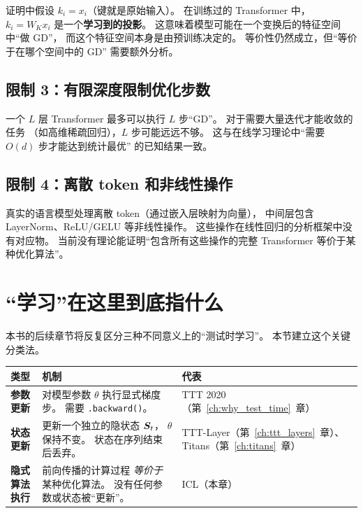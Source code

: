 证明中假设 $k_i = x_i$（键就是原始输入）。
在训练过的 Transformer 中，
$k_i = W_K x_i$ 是一个\textbf{学习到的投影}。
这意味着模型可能在一个变换后的特征空间中``做 GD''，
而这个特征空间本身是由预训练决定的。
等价性仍然成立，但``等价于在哪个空间中的 GD''
需要额外分析。

\subsection*{限制 3：有限深度限制优化步数}

一个 $L$ 层 Transformer 最多可以执行 $L$ 步``GD''。
对于需要大量迭代才能收敛的任务
（如高维稀疏回归），$L$ 步可能远远不够。
这与在线学习理论中``需要 $O(d)$ 步才能达到统计最优''
的已知结果一致。

\subsection*{限制 4：离散 token 和非线性操作}

真实的语言模型处理离散 token（通过嵌入层映射为向量），
中间层包含 LayerNorm、ReLU/GELU 等非线性操作。
这些操作在线性回归的分析框架中没有对应物。
当前没有理论能证明``包含所有这些操作的完整 Transformer
等价于某种优化算法''。

\section{``学习''在这里到底指什么}
\label{sec:icl_what_is_learning}

本书的后续章节将反复区分三种不同意义上的``测试时学习''。
本节建立这个关键分类法。

\begin{center}
\begin{tabular}{p{3cm} p{4.5cm} p{4.5cm}}
\toprule
\textbf{类型} & \textbf{机制} & \textbf{代表} \\
\midrule
\textbf{参数更新}
& 对模型参数 $\theta$ 执行显式梯度步。
  需要 \texttt{.backward()}。
& TTT 2020（第~\ref{ch:why_test_time}~章） \\
\textbf{状态更新}
& 更新一个独立的隐状态 $\boldsymbol{S}_t$，
  $\theta$ 保持不变。
  状态在序列结束后丢弃。
& TTT-Layer（第~\ref{ch:ttt_layers}~章）、
  Titans（第~\ref{ch:titans}~章） \\
\textbf{隐式算法执行}
& 前向传播的计算过程
  \textit{等价于}某种优化算法。
  没有任何参数或状态被``更新''。
& ICL（本章） \\
\bottomrule
\end{tabular}
\end{center}

